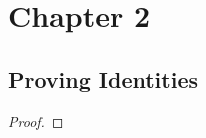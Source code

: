%
\chapter{Chapter 2}
\section{Proving Identities}
\begin{theorem}
    \label{thm:add_zero}
    \leanok
\end{theorem}
\begin{proof}
    \leanok
\end{proof}